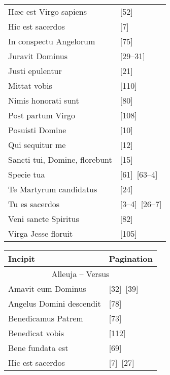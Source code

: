 \begin{landscape}
\begin{table}[ht]
\begin{tabular}{@{}ll@{}}
          Hæc est Virgo sapiens          & [52]            \\
          Hic est sacerdos               & [7]             \\
          In conspectu Angelorum         & [75]            \\
          Juravit Dominus                & [29--31]        \\
          Justi epulentur                & [21]            \\
          Mittat vobis                   & [110]           \\
          Nimis honorati sunt            & [80]            \\
          Post partum Virgo              & [108]           \\
          Posuisti Domine                & [10]            \\
          Qui sequitur me                & [12]            \\
          Sancti tui, Domine, florebunt  & [15]            \\
          Specie tua                     & [61]~[63--4]    \\
          Te Martyrum candidatus         & [24]            \\
          Tu es sacerdos                 & [3--4]~[26--7]  \\
          Veni sancte Spiritus           & [82]            \\
          Virga Jesse floruit            & [105]           \\ \bottomrule
          \end{tabular}
          \hfill
          \begin{tabular}{@{}ll@{}}
            \toprule
            Incipit                    & Pagination \\ \midrule
            \multicolumn{2}{c}{Alleuja -- Versus}     \\
            Amavit eum Dominus       & [32]~[39]      \\
            Angelus Domini descendit & [78]           \\
            Benedicamus Patrem       & [73]           \\
            Benedicat vobis          & [112]          \\
            Bene fundata est         & [69]           \\
            Hic est sacerdos         & [7]~[27]       \\

\end{tabular}
\end{table}
\end{landscape}
